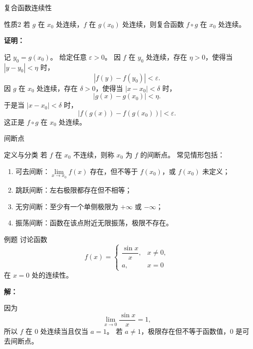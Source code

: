 \documentclass[aspectratio=169,10pt]{ctexbeamer}
\begin{document}
\begin{frame}{复合函数连续性}
    
    \begin{block}{性质2}
    	若 $g$ 在 $x_0$ 处连续，$f$ 在 $g(x_0)$ 处连续，则复合函数 $f\circ g$ 在 $x_0$ 处连续。
    \end{block}
	\textbf{证明：}
	
	记 $y_0=g(x_0)$。 给定任意 $\varepsilon>0$。 因 $f$ 在 $y_0$ 处连续，存在 $\eta>0$，使得当 $|y-y_0|<\eta$ 时，
	\[
	|f(y)-f(y_0)|<\varepsilon.
	\]
	因 $g$ 在 $x_0$ 处连续，存在 $\delta>0$，使得当 $|x-x_0|<\delta$ 时，
	\[
	|g(x)-g(x_0)|<\eta.
	\]
	于是当 $|x-x_0|<\delta$ 时，
	\[
	|f(g(x))-f(g(x_0))|<\varepsilon.
	\]
	这正是 $f\circ g$ 在 $x_0$ 处连续。    
    
\end{frame}

\begin{frame}{间断点}
	\large
	\begin{block}{定义与分类 }
		若 $f$ 在 $x_0$ 不连续，则称 $x_0$ 为 $f$ 的间断点。 常见情形包括：
		\begin{enumerate}
			\item 可去间断：$\lim\limits_{x\to x_0}f(x)$ 存在，但不等于 $f(x_0)$，或 $f(x_0)$ 未定义；
			\item 跳跃间断：左右极限都存在但不相等；
			\item 无穷间断：至少有一个单侧极限为 \(+\infty\) 或 \(-\infty\)；
			\item 振荡间断：函数在该点附近无限振荡，极限不存在。
		\end{enumerate}
	\end{block}
\end{frame}

\begin{frame}
	\begin{block}{例题}
		讨论函数
		\[
		f(x)=
		\begin{cases}
			\dfrac{\sin x}{x},&x\neq0,\\
			a,&x=0
		\end{cases}
		\]
		在 $x=0$ 处的连续性。
	\end{block}
	
	\pause
	
	\vspace{0.4cm}
	
	\textbf{解：}
	
	因为
	\[
	\lim\limits_{x\to0}\frac{\sin x}{x}=1,
	\]
	所以 $f$ 在 $0$ 处连续当且仅当 $a=1$。 若 $a\neq1$，极限存在但不等于函数值，$0$ 是可去间断点。
	
	
\end{frame}
\end{document}
